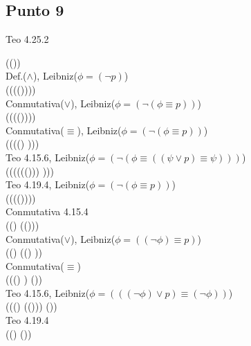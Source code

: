 \documentclass{article}
\begin{document}
\subsection{Punto 9}
\begin{logicenv}{Teo 4.25.2}
    \begin{derivation}
        (\neg (\phi \land \psi))\\
    Def.($\land$), Leibniz($\phi = (\neg p)$)\\
        (\neg (\phi \equiv (\psi \equiv (\phi \lor \psi))))\\
    Conmutativa($\lor$), Leibniz($\phi = (\neg (\phi \equiv p))$)\\
        (\neg (\phi \equiv(\psi \equiv (\psi \lor \phi))))\\
    Conmutativa($\equiv$), Leibniz($\phi = (\neg (\phi \equiv p))$)\\
        (\neg (\phi \equiv ((\psi \lor \phi) \equiv \psi)))\\
    Teo 4.15.6, Leibniz($\phi = (\neg (\phi \equiv ((\psi \lor p) \equiv \psi)))$)\\
        (\neg (\phi \equiv ((\psi \lor (\neg (\neg \phi))) \equiv \psi)))\\
    Teo 4.19.4, Leibniz($\phi = (\neg (\phi \equiv p))$)\\
        (\neg (\phi \equiv (\psi \lor (\neg \phi))))\\
    Conmutativa 4.15.4\\
        ((\neg \phi) \equiv (\psi \lor (\neg \phi)))\\
    Conmutativa($\lor$), Leibniz($\phi = ((\neg \phi) \equiv p)$)\\
        ((\neg \phi) \equiv ((\neg \phi) \lor \psi))\\
    Conmutativa($\equiv$)\\
        (((\neg \phi) \lor \psi) \equiv (\neg \phi))\\
    Teo 4.15.6, Leibniz($\phi = (((\neg \phi) \lor p) \equiv (\neg \phi))$)\\
        (((\neg \phi) \lor (\neg(\neg \psi))) \equiv (\neg \phi))\\
    Teo 4.19.4\\
        ((\neg \phi) \lor (\neg \psi))
    \end{derivation}
\end{logicenv}
\end{document}
